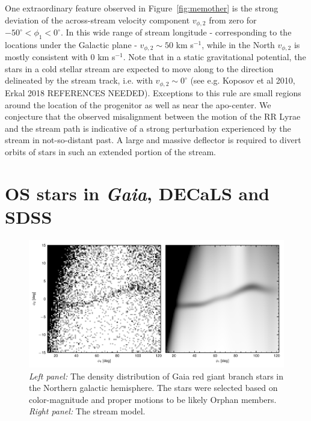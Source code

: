 \documentclass[a4paper,useAMS,usenatbib]{mnras}
\newcommand{\Gaia}{{\it Gaia}}
\begin{document}
One extraordinary feature observed in Figure~\ref{fig:memother} is the
strong deviation of the across-stream velocity component $v_{\phi,2}$
from zero for $-50^{\circ}<\phi_1<0^{\circ}$. In this wide range of
stream longitude - corresponding to the locations under the Galactic
plane - $v_{\phi,2}\sim50$ km s$^{-1}$, while in the North
$v_{\phi,2}$ is mostly consistent with 0 km s$^{-1}$. Note that in a
static gravitational potential, the stars in a cold stellar stream are
expected to move along to the direction delineated by the stream
track, i.e. with $v_{\phi,2}\sim0^{\circ}$ (see e.g. Koposov et al
2010, Erkal 2018 REFERENCES NEEDED). Exceptions to this rule are small
regions around the location of the progenitor as well as near the
apo-center. We conjecture that the observed misalignment between the
motion of the RR Lyrae and the stream path is indicative of a strong
perturbation experienced by the stream in not-so-distant past. A large
and massive deflector is required to divert orbits of stars in such an
extended portion of the stream.

\section{OS stars in \Gaia, DECaLS and SDSS}
\label{sec:rgb}

%
\begin{figure}
  \centering \includegraphics{gaia_fit_plot.pdf}
  \caption[]{{\it Left panel:} The density distribution of Gaia red
    giant branch stars in the Northern galactic hemisphere. The stars
    were selected based on color-magnitude and proper motions to be
    likely Orphan members. {\it Right panel:} The stream model.  }
   \label{fig:gaia_track}
\end{figure}
%
\end{document}

